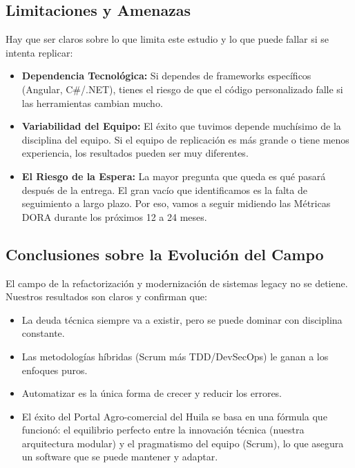 \subsection{Limitaciones y Amenazas}

Hay que ser claros sobre lo que limita este estudio y lo que puede fallar si se intenta replicar:

\begin{itemize}
\item \textbf{Dependencia Tecnológica:} Si dependes de frameworks específicos (Angular, C\#/.NET), tienes el riesgo de que el código personalizado falle si las herramientas cambian mucho.

\item \textbf{Variabilidad del Equipo:} El éxito que tuvimos depende muchísimo de la disciplina del equipo. Si el equipo de replicación es más grande o tiene menos experiencia, los resultados pueden ser muy diferentes.

\item \textbf{El Riesgo de la Espera:} La mayor pregunta que queda es qué pasará después de la entrega. El gran vacío que identificamos es la falta de seguimiento a largo plazo. Por eso, vamos a seguir midiendo las Métricas DORA durante los próximos 12 a 24 meses.
\end{itemize}

\subsection{Conclusiones sobre la Evolución del Campo}

El campo de la refactorización y modernización de sistemas legacy no se detiene. Nuestros resultados son claros y confirman que:

\begin{itemize}
\item La deuda técnica siempre va a existir, pero se puede dominar con disciplina constante.

\item Las metodologías híbridas (Scrum más TDD/DevSecOps) le ganan a los enfoques puros.

\item Automatizar es la única forma de crecer y reducir los errores.

\item El éxito del Portal Agro-comercial del Huila se basa en una fórmula que funcionó: el equilibrio perfecto entre la innovación técnica (nuestra arquitectura modular) y el pragmatismo del equipo (Scrum), lo que asegura un software que se puede mantener y adaptar.
\end{itemize}
